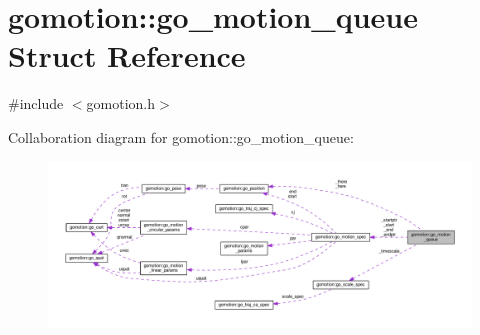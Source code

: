 \hypertarget{structgomotion_1_1go__motion__queue}{\section{gomotion\-:\-:go\-\_\-motion\-\_\-queue Struct Reference}
\label{structgomotion_1_1go__motion__queue}
}


{\ttfamily \#include $<$gomotion.\-h$>$}



Collaboration diagram for gomotion\-:\-:go\-\_\-motion\-\_\-queue\-:\nopagebreak
\begin{figure}[H]
\begin{center}
\leavevmode
\includegraphics[width=350pt]{d3/dfd/structgomotion_1_1go__motion__queue__coll__graph}
\end{center}
\end{figure}
